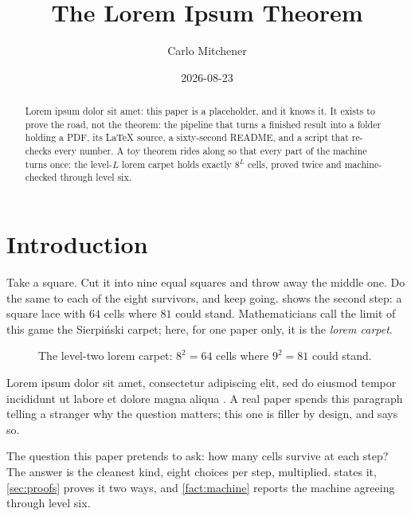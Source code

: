 \documentclass[11pt]{amsart}
\title{The Lorem Ipsum Theorem}
\author{Carlo Mitchener}
\date{2026-08-23}
\theoremstyle{definition}
\theoremstyle{remark}
\begin{document}
\begin{abstract}
Lorem ipsum dolor sit amet: this paper is a placeholder, and it knows it. It exists to prove the road, not the theorem: the pipeline that turns a finished result into a folder holding a PDF, its \LaTeX{} source, a sixty-second README, and a script that re-checks every number. A toy theorem rides along so that every part of the machine turns once: the level-$L$ lorem carpet holds exactly $8^L$ cells, proved twice and machine-checked through level six.
\end{abstract}

\maketitle

\section{Introduction}

Take a square. Cut it into nine equal squares and throw away the middle one. Do the same to each of the eight survivors, and keep going.  shows the second step: a square lace with $64$ cells where $81$ could stand. Mathematicians call the limit of this game the Sierpi\'nski carpet; here, for one paper only, it is the \emph{lorem carpet}.

\begin{figure}[ht]
\centering
{}
\caption{The level-two lorem carpet: $8^2 = 64$ cells where $9^2 = 81$ could stand.}
\label{fig:carpet}
\end{figure}

Lorem ipsum dolor sit amet, consectetur adipiscing elit, sed do eiusmod tempor incididunt ut labore et dolore magna aliqua \cite{cicero}. A real paper spends this paragraph telling a stranger why the question matters; this one is filler by design, and says so.

The question this paper pretends to ask: how many cells survive at each step? The answer is the cleanest kind, eight choices per step, multiplied.  states it, \cref{sec:proofs} proves it two ways, and \cref{fact:machine} reports the machine agreeing through level six.
\end{document}
